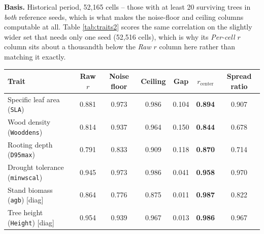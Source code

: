 \documentclass[11pt]{article}
\begin{document}
\begin{table}[h]
{\textbf{Basis.} Historical period, 52{,}165 cells -- those with at least 20 surviving trees in \emph{both} reference seeds, which is what makes the noise-floor and ceiling columns computable at all. Table \ref{tab:traits2} scores the same correlation on the slightly wider set that needs only one seed (52{,}516 cells), which is why its \emph{Per-cell $r$} column sits about a thousandth below the \emph{Raw $r$} column here rather than matching it exactly.}
\label{tab:traits}
\small
\begin{tabular}{lcccccc}
\toprule
Trait & Raw $r$ & Noise floor & Ceiling & Gap & $r_\mathrm{center}$ & Spread ratio \\
\midrule
Specific leaf area (\texttt{SLA}) & 0.881 & 0.973 & 0.986 & 0.104 & \textbf{0.894} & 0.907 \\
Wood density (\texttt{Wooddens}) & 0.814 & 0.937 & 0.964 & 0.150 & \textbf{0.844} & 0.678 \\
Rooting depth (\texttt{D95max}) & 0.791 & 0.833 & 0.909 & 0.118 & \textbf{0.870} & 0.714 \\
Drought tolerance (\texttt{minwscal}) & 0.945 & 0.973 & 0.986 & 0.041 & \textbf{0.958} & 0.970 \\
\addlinespace
Stand biomass (\texttt{agb}) [diag] & 0.864 & 0.776 & 0.875 & 0.011 & \textbf{0.987} & 0.822 \\
Tree height (\texttt{Height}) [diag] & 0.954 & 0.939 & 0.967 & 0.013 & \textbf{0.986} & 0.967 \\
\bottomrule
\end{tabular}
\end{table}
\end{document}
